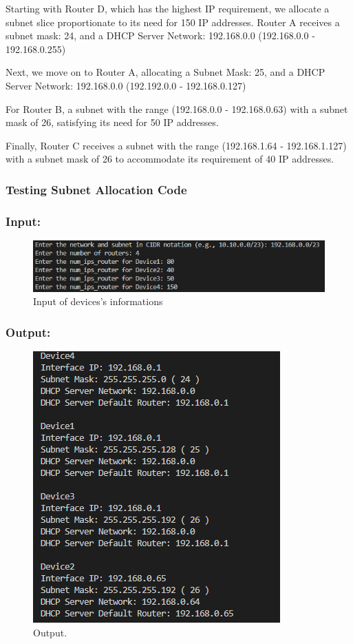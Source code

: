Starting with Router D, which has the highest IP requirement, we allocate a subnet slice proportionate to its need for 150 IP addresses. Router A receives a subnet mask: 24, and a DHCP Server Network: 192.168.0.0  (192.168.0.0 - 192.168.0.255)

Next, we move on to Router A, allocating a Subnet Mask: 25, and a DHCP Server Network: 192.168.0.0  (192.192.0.0 - 192.168.0.127)

For Router B, a subnet with the range (192.168.0.0 - 192.168.0.63) with a subnet mask of 26, satisfying its need for 50 IP addresses.

Finally, Router C receives a subnet with the range (192.168.1.64 - 192.168.1.127) with a subnet mask of 26 to accommodate its requirement of 40 IP addresses.

\subsubsection{Testing Subnet Allocation Code}
\subsubsection{Input:}
\begin{figure}[h]
  \centering
  \includegraphics[width=0.5\linewidth]{Images/prototype_input.png}
  \caption{Input of devices's informations}
\end{figure}
\subsubsection{Output:}
\begin{figure}[h]
  \centering
  \includegraphics[width=0.3\linewidth]{Images/prototype_output.png}
  \caption{Output.}
\end{figure}
